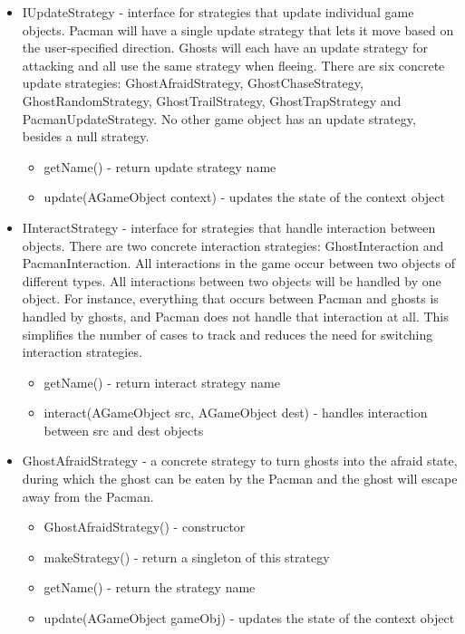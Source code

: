 \documentclass[letterpaper, 11pt]{article}
\begin{document}
\begin{itemize}
  \item IUpdateStrategy - interface for strategies that update individual game objects. Pacman will have a single update strategy that lets it move based on the user-specified direction. Ghosts will each have an update strategy for attacking and all use the same strategy when fleeing. There are six concrete update strategies: GhostAfraidStrategy, GhostChaseStrategy, GhostRandomStrategy, GhostTrailStrategy, GhostTrapStrategy and PacmanUpdateStrategy. No other game object has an update strategy, besides a null strategy.
  \begin{itemize}
    \item getName() - return update strategy name
    \item update(AGameObject context) - updates the state of the context object
  \end{itemize}  
  \item IInteractStrategy - interface for strategies that handle interaction between objects. There are two concrete interaction strategies: GhostInteraction and PacmanInteraction. All interactions in the game occur between two objects of different types. All interactions between two objects will be handled by one object. For instance, everything that occurs between Pacman and ghosts is handled by ghosts, and Pacman does not handle that interaction at all. This simplifies the number of cases to track and reduces the need for switching interaction strategies.
  \begin{itemize}
    \item getName() - return interact strategy name
    \item interact(AGameObject src, AGameObject dest) - handles interaction between src and dest objects
  \end{itemize}
  \iffalse
  \item GhostAfraidStrategy - a concrete strategy to turn ghosts into the afraid state, during which the ghost can be eaten by the Pacman and the ghost will escape away from the Pacman.
  \begin{itemize}
  \item GhostAfraidStrategy() - constructor
  \item makeStrategy() - return a singleton of this strategy
  \item getName() - return the strategy name
  \item update(AGameObject gameObj) - updates the state of the context object

\end{itemize}
\end{itemize}
\end{document}

